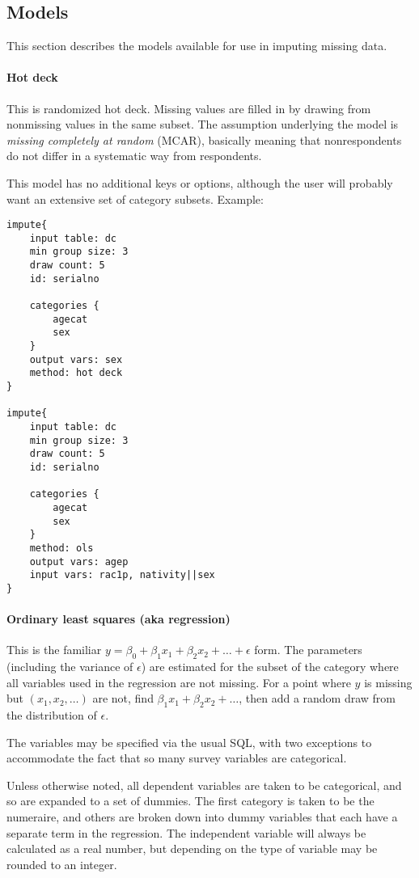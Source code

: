 \documentclass{article}
\begin{document}
\subsection{Models} This section describes the models available for use in imputing
missing data.

\paragraph{Hot deck} This is randomized hot deck. Missing values are filled in by
drawing from nonmissing values in the same subset. The assumption underlying the model
is {\em missing completely at random} (MCAR), basically meaning that nonrespondents
do not differ in a systematic way from respondents.

This model has no additional keys or options, although the user will probably want an
extensive set of category subsets. Example:

\begin{lstlisting}
impute{
    input table: dc
    min group size: 3
    draw count: 5
    id: serialno

    categories {
        agecat
        sex
    }
    output vars: sex
    method: hot deck
}

impute{
    input table: dc
    min group size: 3
    draw count: 5
    id: serialno

    categories {
        agecat
        sex
    }
    method: ols
    output vars: agep
    input vars: rac1p, nativity||sex
}
\end{lstlisting}

\paragraph{Ordinary least squares (aka regression)}  This is the familiar $y = \beta_0 
+ \beta_1 x_1  + \beta_2 x_2 + \dots +\epsilon$ form. The parameters (including the
variance of $\epsilon$) are estimated for the subset of the category where all variables
used in the regression are not missing. For a point where $y$ is missing but $(x_1, x_2, \dots)$ are not,
find $\beta_1 x_1  + \beta_2 x_2 + \dots$, then add a random draw from the distribution of
$\epsilon$.

The variables may be specified via the usual SQL, with two exceptions to accommodate the
fact that so many survey variables are categorical.

Unless otherwise noted, all dependent variables are taken to be categorical, and so are expanded to 
a set of dummies. The first category is taken to be the numeraire, and others are broken
down into dummy variables that each have a separate term in the regression. The
independent variable will always be calculated as a real number, but depending on the type
of variable may be rounded to an integer.
\end{document}
